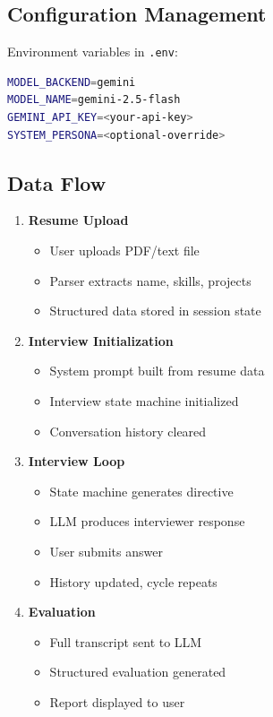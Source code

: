 \documentclass[12pt,a4paper]{article}
\begin{document}
\subsection{Configuration Management}

Environment variables in \texttt{.env}:
\begin{lstlisting}[language=bash, caption=Environment Configuration]
MODEL_BACKEND=gemini
MODEL_NAME=gemini-2.5-flash
GEMINI_API_KEY=<your-api-key>
SYSTEM_PERSONA=<optional-override>
\end{lstlisting}

\subsection{Data Flow}

\begin{enumerate}
    \item \textbf{Resume Upload}
    \begin{itemize}
        \item User uploads PDF/text file
        \item Parser extracts name, skills, projects
        \item Structured data stored in session state
    \end{itemize}
    
    \item \textbf{Interview Initialization}
    \begin{itemize}
        \item System prompt built from resume data
        \item Interview state machine initialized
        \item Conversation history cleared
    \end{itemize}
    
    \item \textbf{Interview Loop}
    \begin{itemize}
        \item State machine generates directive
        \item LLM produces interviewer response
        \item User submits answer
        \item History updated, cycle repeats
    \end{itemize}
    
    \item \textbf{Evaluation}
    \begin{itemize}
        \item Full transcript sent to LLM
        \item Structured evaluation generated
        \item Report displayed to user
    \end{itemize}
    

\end{enumerate}
\end{document}
